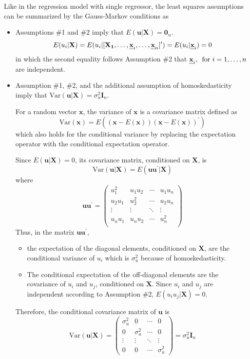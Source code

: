\documentclass[a4paper,11pt]{article}
\newcommand{\var}{\mathrm{Var}}
\def\mathbi#1{\textbf{\em #1}}
\begin{document}
Like in the regression model with single regressor, the least
squares assumptions can be summarized by the Gauss-Markov conditions
as
\begin{itemize}
\item Assumptions \#1 and \#2 imply that \(E(\mathbf{u} | \mathbf{X}) = \mathbf{0}_n\).
\[E(u_i | \mathbf{X}) = E(u_i | [\mathbf{X_1}, \ldots, \mathbi{x}_i,
  \ldots, \mathbi{x}_n]^{\prime}) = E(u_i | \mathbi{x}_i) = 0\]
in  which the second equality follows Assumption \#2 that
\(\mathbi{x}_i,\,\text{ for } i = 1,\ldots,n\) are independent.

\item Assumption \#1, \#2, and the additional assumption of homoskedasticity
imply that \(\var(\mathbf{u} | \mathbf{X}) = \sigma^2_u \mathbf{I}_n\).

For a random vector \(\mathbf{x}\), the variance of \(\mathbf{x}\) is a
covariance matrix defined as
\[ \var(\mathbf{x}) =
  E\left((\mathbf{x}-E(\mathbf{x}))(\mathbf{x}-E(\mathbf{x}))^{\prime}\right)
  \]
which also holds for the conditional variance by replacing the
expectation operator with the conditional expectation operator.

Since \(E(\mathbf{u} | \mathbf{X}) = 0\), its covariance matrix,
conditioned on \(\mathbf{X}\), is
\[ \var(\mathbf{u} | \mathbf{X}) = E(\mathbf{u} \mathbf{u}^{\prime} | \mathbf{X})
  \]
where
\begin{equation*}
\mathbf{u} \mathbf{u}^{\prime} =
\begin{pmatrix}
u_1^2 & u_1 u_2 & \cdots &u_1 u_n \\
u_2 u_1 & u_2^2 & \cdots & u_2 u_n \\
\vdots & \vdots & \ddots & \vdots \\
u_n u_1 & u_n u_2 & \cdots & u_n^2 \\
\end{pmatrix}
\end{equation*}
Thus, in the matrix \(\mathbf{u} \mathbf{u}^{\prime}\),
\begin{itemize}
\item the expectation of the diagonal elements, conditioned on \(\mathbf{X}\),
are the conditional variance of \(u_i\) which is \(\sigma^2_u\) because
of homoskedasticity.
\item The conditional expectation of the off-diagonal elements are the
covariance of \(u_i\) and \(u_j\), conditioned on \(\mathbf{X}\). Since
\(u_i\) and \(u_j\) are independent according to Assumption \#2, \(E(u_i
    u_j | \mathbf{X}) = 0\).
\end{itemize}
Therefore, the conditional covariance matrix of \(\mathbf{u}\) is
\begin{equation*}
\var(\mathbf{u} | \mathbf{X}) =
\begin{pmatrix}
\sigma^2_u & 0 & \cdots & 0 \\
0 & \sigma^2_u & \cdots & 0 \\
\vdots & \vdots & \ddots & \vdots \\
0 & 0 & \cdots & \sigma^2_u
\end{pmatrix}
= \sigma^2_u \mathbf{I}_n
\end{equation*}
\end{itemize}
\end{document}
